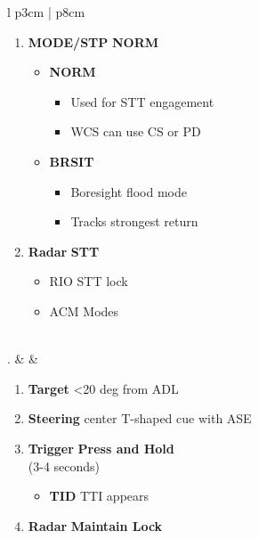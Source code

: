 \documentclass[8pt,usenames,dvipsnames,twoside]{article}
\begin{document}
\begin{center}
\begin{tabular}{l p{3cm} | p{8cm}}
\begin{minipage}[t]{\linewidth}
					\vspace{-7pt}
					\begin{enumerate}[label=(\alph*)]
						\item \textbf{MODE/STP} \dotfill \textbf{NORM}
						\begin{itemize}
							\item \textbf{NORM}
							\begin{itemize}
								\item Used for STT engagement
								\item WCS can use CS or PD
							\end{itemize}
							\item \textbf{BRSIT}
							\begin{itemize}
								\item Boresight flood mode
								\item Tracks strongest return
							\end{itemize}
						\end{itemize}
						\item \textbf{Radar} \dotfill \textbf{STT}
						\begin{itemize}
							\item RIO STT lock
							\item ACM Modes
						\end{itemize}
					\end{enumerate}
				\end{minipage} \\
				. &  & 
				\begin{minipage}[t]{\linewidth}
					\vspace{-7pt}
					\begin{enumerate}[label=(\alph*)]
						\item \textbf{Target} \dotfill <20 deg from ADL
						\item \textbf{Steering} \dotfill center T-shaped cue with ASE
						\item \textbf{Trigger} \dotfill \textbf{Press and Hold} \\
						\hfill (3-4 seconds)
						\begin{itemize}
							\item \textbf{TID} \dotfill TTI appears
						\end{itemize}
						
						\item \textbf{Radar} \dotfill \textbf{Maintain Lock}
					\end{enumerate}
				\end{minipage} \\
				\bottomrule
			\end{tabular}
		\end{center}
		
\end{document}
